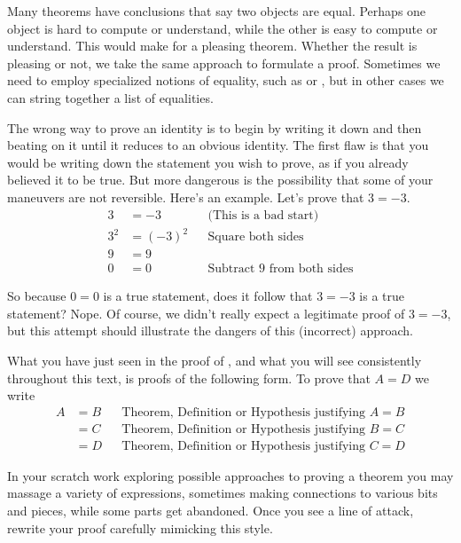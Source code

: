 \begin{para}Many theorems have conclusions that say two objects are equal.  Perhaps one object is hard to compute or understand, while the other is easy to compute or understand.  This would make for a pleasing theorem.  Whether the result is pleasing or not, we take the same approach to formulate a proof.  Sometimes we need to employ specialized notions of equality, such as  or , but in other cases we can string together a list of equalities.\end{para}
%
\begin{para}The wrong way to prove an identity is to begin by writing it down and then beating on it until it reduces to an obvious identity.  The first flaw is that you would be writing down the statement you wish to prove, as if you already believed it to be true.  But more dangerous is the possibility that some of your maneuvers are not reversible.  Here's an example.  Let's prove that $3=-3$.
%
\begin{align*}
3&=-3&&\text{(This is a bad start)}\\
3^2&=(-3)^2&&\text{Square both sides}\\
9&=9\\
0&=0&&\text{Subtract 9 from both sides}
\end{align*}\end{para}
%
\begin{para}So because $0=0$ is a true statement, does it follow that $3=-3$ is a true statement?  Nope.  Of course, we didn't really expect a legitimate proof of $3=-3$, but this attempt should illustrate the dangers of this (incorrect) approach.\end{para}
%
\begin{para}What you have just seen in the proof of , and what you will see consistently throughout this text, is proofs of the following form.  To prove that $A=D$ we write
%
\begin{align*}
A
&=B&&\text{Theorem, Definition or Hypothesis justifying $A=B$}\\
&=C&&\text{Theorem, Definition or Hypothesis justifying $B=C$}\\
&=D&&\text{Theorem, Definition or Hypothesis justifying $C=D$}
\end{align*}\end{para}
%
\begin{para}In your scratch work exploring possible approaches to proving a theorem you may massage a variety of expressions, sometimes making connections to various bits and pieces, while some parts get abandoned.  Once you see a line of attack, rewrite your proof carefully mimicking this style.\end{para}

